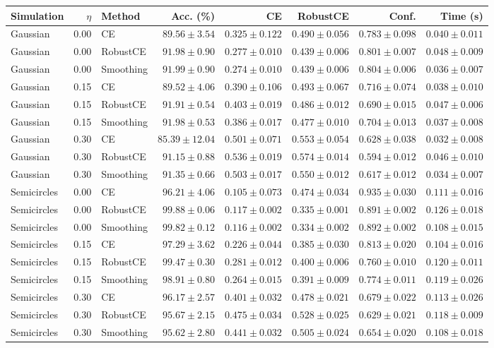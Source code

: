 \begin{tabular}{@{}lrlrrrrr@{}}
\toprule
Simulation & $\eta$ & Method & Acc. (\%) & CE & RobustCE & Conf. & Time (s) \\
\midrule
Gaussian & 0.00 & CE & $89.56\pm3.54$ & $0.325\pm0.122$ & $0.490\pm0.056$ & $0.783\pm0.098$ & $0.040\pm0.011$ \\
Gaussian & 0.00 & RobustCE & $91.98\pm0.90$ & $0.277\pm0.010$ & $0.439\pm0.006$ & $0.801\pm0.007$ & $0.048\pm0.009$ \\
Gaussian & 0.00 & Smoothing & $91.99\pm0.90$ & $0.274\pm0.010$ & $0.439\pm0.006$ & $0.804\pm0.006$ & $0.036\pm0.007$ \\
\addlinespace
Gaussian & 0.15 & CE & $89.52\pm4.06$ & $0.390\pm0.106$ & $0.493\pm0.067$ & $0.716\pm0.074$ & $0.038\pm0.010$ \\
Gaussian & 0.15 & RobustCE & $91.91\pm0.54$ & $0.403\pm0.019$ & $0.486\pm0.012$ & $0.690\pm0.015$ & $0.047\pm0.006$ \\
Gaussian & 0.15 & Smoothing & $91.98\pm0.53$ & $0.386\pm0.017$ & $0.477\pm0.010$ & $0.704\pm0.013$ & $0.037\pm0.008$ \\
\addlinespace
Gaussian & 0.30 & CE & $85.39\pm12.04$ & $0.501\pm0.071$ & $0.553\pm0.054$ & $0.628\pm0.038$ & $0.032\pm0.008$ \\
Gaussian & 0.30 & RobustCE & $91.15\pm0.88$ & $0.536\pm0.019$ & $0.574\pm0.014$ & $0.594\pm0.012$ & $0.046\pm0.010$ \\
Gaussian & 0.30 & Smoothing & $91.35\pm0.66$ & $0.503\pm0.017$ & $0.550\pm0.012$ & $0.617\pm0.012$ & $0.034\pm0.007$ \\
\addlinespace
Semicircles & 0.00 & CE & $96.21\pm4.06$ & $0.105\pm0.073$ & $0.474\pm0.034$ & $0.935\pm0.030$ & $0.111\pm0.016$ \\
Semicircles & 0.00 & RobustCE & $99.88\pm0.06$ & $0.117\pm0.002$ & $0.335\pm0.001$ & $0.891\pm0.002$ & $0.126\pm0.018$ \\
Semicircles & 0.00 & Smoothing & $99.82\pm0.12$ & $0.116\pm0.002$ & $0.334\pm0.002$ & $0.892\pm0.002$ & $0.108\pm0.015$ \\
\addlinespace
Semicircles & 0.15 & CE & $97.29\pm3.62$ & $0.226\pm0.044$ & $0.385\pm0.030$ & $0.813\pm0.020$ & $0.104\pm0.016$ \\
Semicircles & 0.15 & RobustCE & $99.47\pm0.30$ & $0.281\pm0.012$ & $0.400\pm0.006$ & $0.760\pm0.010$ & $0.120\pm0.011$ \\
Semicircles & 0.15 & Smoothing & $98.91\pm0.80$ & $0.264\pm0.015$ & $0.391\pm0.009$ & $0.774\pm0.011$ & $0.119\pm0.026$ \\
\addlinespace
Semicircles & 0.30 & CE & $96.17\pm2.57$ & $0.401\pm0.032$ & $0.478\pm0.021$ & $0.679\pm0.022$ & $0.113\pm0.026$ \\
Semicircles & 0.30 & RobustCE & $95.67\pm2.15$ & $0.475\pm0.034$ & $0.528\pm0.025$ & $0.629\pm0.021$ & $0.118\pm0.009$ \\
Semicircles & 0.30 & Smoothing & $95.62\pm2.80$ & $0.441\pm0.032$ & $0.505\pm0.024$ & $0.654\pm0.020$ & $0.108\pm0.018$ \\
\bottomrule
\end{tabular}
